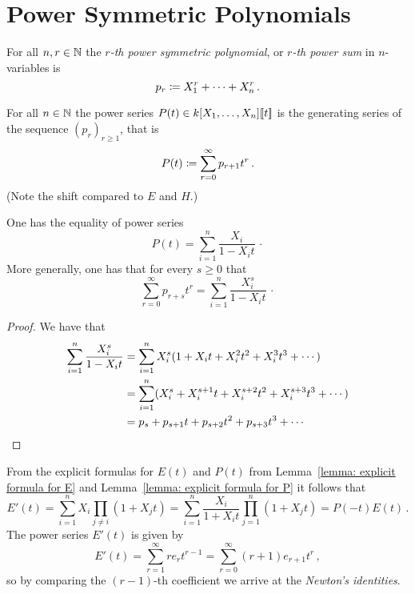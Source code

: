 \section{Power Symmetric Polynomials}


\begin{definition}
  For all $n, r \in \mathbb{N}$ the \emph{$r$-th power symmetric polynomial}, or \emph{$r$-th power sum} in $n$-variables is
  \[
              p_r
    \coloneqq  X_1^r + \dotsb + X_n^r \,.
  \]
\end{definition}


\begin{definition}
  For all $n \in \mathbb{N}$ the power series $P(t) \in k[X_1, \dotsc, X_n]\!\left[\!\left[t\right]\!\right]$ is the generating series of the sequence $(p_r)_{r \geq 1}$, that is
  \[
            P(t)
  \coloneqq  \sum_{r=0}^\infty p_{r+1} t^r \,.
  \]
  (Note the shift compared to $E$ and $H$.)
\end{definition}


\begin{lemma}
  \label{lemma: explicit formula for P}
  One has the equality of power series
  \[
      P(t)
    = \sum_{i=1}^n \frac{X_i}{1 - X_i t} \,\cdotp
  \]
  More generally, one has that for every $s \geq 0$ that
  \[
      \sum_{r=0}^\infty p_{r+s} t^r
    = \sum_{i=1}^n \frac{X_i^s}{1 - X_i t} \,\cdotp
  \]
\end{lemma}


\begin{proof}
  We have that
  \begin{align*}
        \sum_{i=1}^n \frac{X_i^s}{1-X_i t}
    &=  \sum_{i=1}^n X_i^s (1 + X_i t + X_i^2 t^2 + X_i^3 t^3 + \dotsb) \\
    &=  \sum_{i=1}^n (X_i^s + X_i^{s+1} t + X_i^{s+2} t^2 + X_i^{s+3} t^3 + \dotsb) \\
    &=  p_s + p_{s+1} t + p_{s+2} t^2 + p_{s+3} t^3 + \dotsb
    \qedhere
  \end{align*}
\end{proof}


\begin{fluff}
  \label{fluff: connection between E and P}
  From the explicit formulas for $E(t)$ and $P(t)$ from Lemma~\ref{lemma: explicit formula for E} and Lemma~\ref{lemma: explicit formula for P} it follows that
  \[
      E'(t)
    = \sum_{i=1}^n X_i \prod_{j \neq i} (1 + X_j t)
    = \sum_{i=1}^n \frac{X_i}{1 + X_i t} \prod_{j=1}^n (1 + X_j t)
    = P(-t)E(t) \,.
  \]
  The power series $E'(t)$ is given by
  \[
      E'(t)
    = \sum_{r=1}^\infty r e_r t^{r-1}
    = \sum_{r=0}^\infty (r+1) e_{r+1} t^r \,,
  \]
  so by comparing the $(r-1)$-th coefficient we arrive at the \emph{Newton’s identities}.
\end{fluff}


